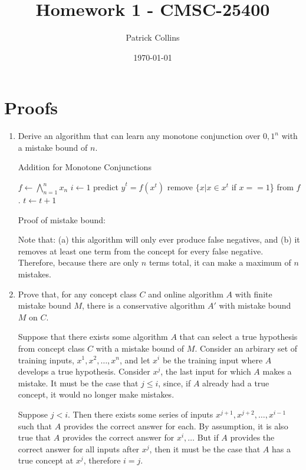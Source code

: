 \documentclass{article}
\begin{document}
\title{Homework 1 - CMSC-25400}
\author{Patrick Collins}
\date{\today}
\maketitle

\section{Proofs}
\begin{enumerate}
\item Derive an algorithm that can learn any monotone conjunction over
  ${0, 1}^n$ with a mistake bound of $n$. \\

\begin{algorithm}
\caption{Addition for Monotone Conjunctions}
\begin{algorithmic}[1]
\State $f \gets \bigwedge\limits_{n=1}^n x_n$
\State $i \gets 1$
\State predict $\hat{y}^t = f(x^t)$
\State remove $\{x | x \in x^t$ if $x == 1$\} from $f$.
\EndIf
\State $t \gets t + 1$
\EndWhile
\end{algorithmic}
\end{algorithm}

Proof of mistake bound:

Note that: (a) this algorithm will only ever produce false
negatives, and (b) it removes at least one term from the
concept for every false negative. Therefore, because there are only
$n$ terms total, it can make a maximum of $n$ mistakes. 

\item Prove that, for any concept class $C$ and online algorithm $A$
  with finite mistake bound $M$, there is a conservative algorithm
  $A'$ with mistake bound $M$ on $C$. 

Suppose that there exists some algorithm $A$ that can select a true
hypothesis from concept class $C$ with a mistake bound of
$M$. Consider an arbirary set of training inputs, $x^1,
x^2,\dots,x^n$, and let $x^i$ be the training input where $A$ develops a true
hypothesis. Consider $x^j$, the last input for which $A$ makes a
mistake. It must be the case that $j \leq i$, since, if $A$ already had a
true concept, it would no longer make mistakes. 

Suppose $j < i$. Then there exists some series of inputs $x^{j+1},
x^{j+2},\dots,x^{i-1}$ such that $A$ provides the correct answer for
each. By assumption, it is also true that $A$ provides the correct
answer for $x^i,\dots$ But if $A$ provides the correct answer for all
inputs after $x^j$, then it must be the case that $A$ has a true
concept at $x^j$, therefore $i = j$. 


\end{enumerate}
\end{document}
